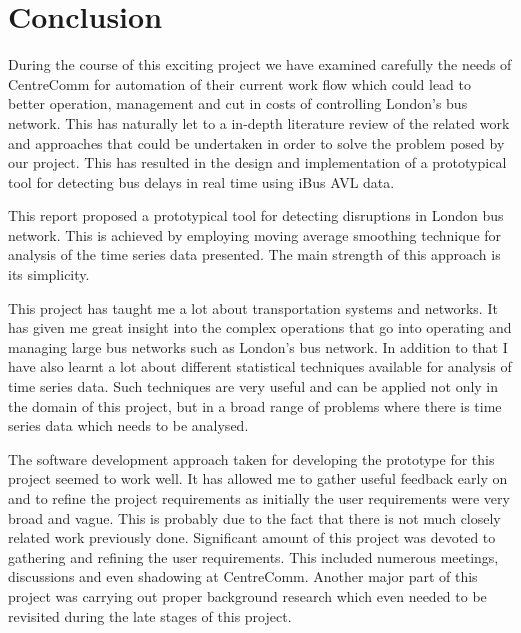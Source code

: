 \chapter{Conclusion}
During the course of this exciting project we have examined carefully the needs of CentreComm for automation of their current work flow which could lead to better operation, management and cut in costs of controlling London's bus network. This has naturally let to a in-depth literature review of the related work and approaches that could be undertaken in order to solve the problem posed by our project. This has resulted in the design and implementation of a prototypical tool for detecting bus delays in real time using iBus AVL data.

This report proposed a prototypical tool for detecting disruptions in London bus network. This is achieved by employing moving average smoothing technique for analysis of the time series data presented. The main strength of this approach is its simplicity. 


This project has taught me a lot about transportation systems and networks. It has given me great insight into the complex operations that go into operating and managing large bus networks such as London's bus network. In addition to that I have also learnt a lot about different statistical techniques available for analysis of time series data. Such techniques are very useful and can be applied not only in the domain of this project, but in a broad range of problems where there is time series data which needs to be analysed. 

The software development approach taken for developing the prototype for this project seemed to work well. It has allowed me to gather useful feedback early on and to refine the project requirements as initially the user requirements were very broad and vague. This is probably due to the fact that there is not much closely related work previously done. Significant amount of this project was devoted to gathering and refining the user requirements. This included numerous meetings, discussions and even shadowing at CentreComm. Another major part of this project was carrying out proper background research which even needed to be revisited during the late stages of this project. 


